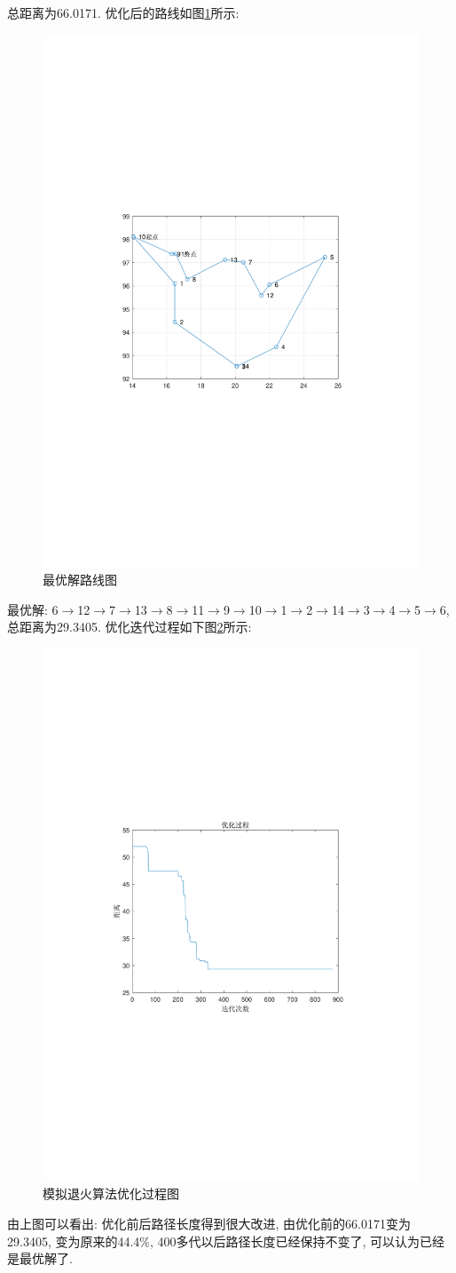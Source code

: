 \documentclass{article}
\begin{document}
\begin{homeworkProblem}
    总距离为66.0171. 优化后的路线如图\ref{fig:最优解路线图}所示:
    \begin{figure}[H]  %
        \centering
        \includegraphics[width=0.55\linewidth]{images/title/最优解路线图.pdf}
        \caption{最优解路线图}
        \label{fig:最优解路线图}
    \end{figure}
    最优解: 6$\to $12$\to $7$\to $13$\to $8$\to $11$\to $9$\to $10$\to $1$\to $2$\to $14$\to $3$\to $4$\to $5$\to $6, 总距离为29.3405. 优化迭代过程如下图\ref{fig:模拟退火算法优化过程图}所示:
    \begin{figure}[H]  %
        \centering
        \includegraphics[width=0.55\linewidth]{images/title/模拟退火算法优化过程图.pdf}
        \caption{模拟退火算法优化过程图}
        \label{fig:模拟退火算法优化过程图}
    \end{figure}
    由上图可以看出: 优化前后路径长度得到很大改进, 由优化前的66.0171变为29.3405, 变为原来的44.4\%, 400多代以后路径长度已经保持不变了, 可以认为已经是最优解了.
\end{homeworkProblem}
\end{document}
